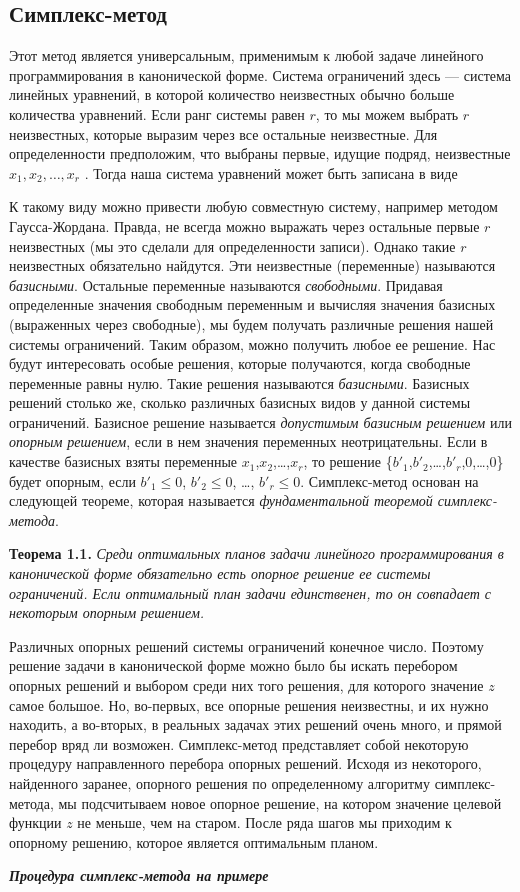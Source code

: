\documentclass{article}
\begin{document}
\subsection{Симплекс-метод}
Этот метод является универсальным, применимым к любой задаче линейного программирования в канонической форме. Система ограничений здесь — система линейных уравнений, в которой количество неизвестных обычно  больше  количества  уравнений. Если  ранг  системы равен $r$, то мы можем выбрать $r$ неизвестных, которые выразим через все остальные неизвестные. Для определенности предположим, что выбраны  первые, идущие подряд, неизвестные $x_1,x_2,\dots,x_r$ . Тогда наша система уравнений может быть записана в виде

К такому виду можно привести любую совместную систему, например методом Гаусса-Жордана. Правда, не всегда можно выражать через остальные первые $r$ неизвестных (мы это сделали для определенности записи). Однако такие $r$ неизвестных обязательно найдутся. Эти неизвестные (переменные) называются \textit{базисными}. Остальные переменные называются   \textit{свободными}. Придавая определенные значения свободным переменным и вычисляя значения базисных (выраженных через свободные), мы будем получать различные решения нашей системы ограничений. Таким образом, можно получить любое ее решение. Нас будут интересовать особые решения, которые  получаются, когда свободные переменные равны нулю. Такие решения  называются \textit{базисными}. Базисных решений столько же, сколько  различных  базисных видов у данной системы ограничений. Базисное решение называется \textit{допустимым базисным решением} или \textit{опорным решением}, если в нем значения переменных неотрицательны. Если в качестве базисных взяты переменные $x_1$,$x_2$,\dots,$x_r$, то решение \{$b'_1$,$b'_2$,\dots,$b'_r$,0,\dots,0\} будет опорным, если $b'_1 \leq 0$,    $b'_2 \leq 0$, \dots, $b'_r \leq 0$. Симплекс-метод основан на следующей теореме, которая называется \textit{фундаментальной теоремой симплекс-метода}. 

\textbf{Теорема 1.1.} \textit{Среди оптимальных планов задачи линейного программирования в канонической форме обязательно есть опорное решение ее системы ограничений. Если оптимальный план задачи единственен, то он совпадает с некоторым опорным  решением.}

Различных опорных решений системы ограничений конечное число. Поэтому решение задачи в канонической форме можно было бы искать  перебором опорных решений и выбором среди них того решения,  для  которого  значение $z$ самое большое. Но, во-первых, все опорные решения неизвестны, и их нужно находить, а во-вторых, в реальных задачах этих решений очень много, и прямой перебор вряд ли возможен. Симплекс-метод  представляет собой  некоторую  процедуру  направленного перебора опорных решений.  Исходя из некоторого, найденного заранее, опорного решения по определенному алгоритму симплекс-метода, мы подсчитываем новое опорное решение, на котором значение целевой функции $z$ не меньше, чем на старом. После ряда шагов мы приходим к опорному решению, которое является  оптимальным планом.
\begin{center}
\textit{\textbf{Процедура симплекс-метода на примере}}
\end{center}
\end{document}

